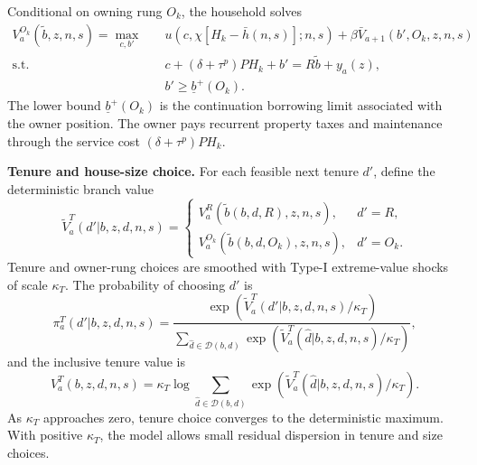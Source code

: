\documentclass[11pt]{article}
\newcommand{\Dset}{\mathcal D}
\begin{document}
Conditional on owning rung $O_k$, the household solves
\begin{equation}
\begin{aligned}
V^{O_k}_a(\widetilde b,z,n,s)
=
\max_{c,b'}\quad
&u\!\left(c,\chi[H_k-\bar h(n,s)];n,s\right)
+\beta \bar V_{a+1}(b',O_k,z,n,s)\\
\text{s.t.}\quad
&c+(\delta+\tau^p)PH_k+b'=R\widetilde b+y_a(z),\\
&b'\geq \underline b^+ (O_k).
\end{aligned}
\label{eq:owner_problem}
\end{equation}
The lower bound $\underline b^+(O_k)$ is the continuation borrowing limit
associated with the owner position. The owner pays recurrent property taxes and
maintenance through the service cost $(\delta+\tau^p)PH_k$.

\textbf{Tenure and house-size choice.}
For each feasible next tenure $d'$, define the deterministic branch value
\begin{equation}
\widetilde V^T_a(d'|b,z,d,n,s)
=
\begin{cases}
V^R_a(\widetilde b(b,d,R),z,n,s), & d'=R,\\
V^{O_k}_a(\widetilde b(b,d,O_k),z,n,s), & d'=O_k.
\end{cases}
\label{eq:tenure_branch_value}
\end{equation}
Tenure and owner-rung choices are smoothed with Type-I extreme-value shocks of
scale $\kappa_T$. The probability of choosing $d'$ is
\begin{equation}
\pi^T_a(d'|b,z,d,n,s)
=
\frac{
\exp\left(\widetilde V^T_a(d'|b,z,d,n,s)/\kappa_T\right)
}{
\sum_{\hat d\in\Dset(b,d)}
\exp\left(\widetilde V^T_a(\hat d|b,z,d,n,s)/\kappa_T\right)
},
\label{eq:tenure_probs}
\end{equation}
and the inclusive tenure value is
\begin{equation}
V^T_a(b,z,d,n,s)
=
\kappa_T
\log
\sum_{\hat d\in\Dset(b,d)}
\exp\left(\widetilde V^T_a(\hat d|b,z,d,n,s)/\kappa_T\right).
\label{eq:tenure_iv}
\end{equation}
As $\kappa_T$ approaches zero, tenure choice converges to the deterministic
maximum. With positive $\kappa_T$, the model allows small residual dispersion in
tenure and size choices.
\end{document}

